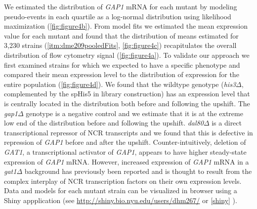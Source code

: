 {We estimated the distribution of \textit{GAP1} mRNA for each mutant by
modeling pseudo-events in each quartile as a
log-normal distribution using likelihood maximization  
(\autoref{fig:figure4b}). 
From model fits we estimated the mean expression value for each
mutant and found that the distribution of means estimated for
3,230 strains (\autoref{itm:dme209pooledFits}, \autoref{fig:figure4c}) 
recapitulates the overall
distribution of flow cytometry signal (\autoref{fig:figure4a}). 
To validate our approach we first examined
strains for which we expected to have a specific phenotype and
compared their mean expression level to the distribution of expression
for the entire population (\autoref{fig:figure4d}). We found that the wildtype
genotype (\textit{his3}$\Delta$, complemented by the spHis5 in
library construction) has an expression level that is centrally
located in the distribution both before and following the upshift. The
\textit{gap1}$\Delta$ genotype is a negative control and 
we estimate that it is at the extreme
low end of the distribution before and following the upshift. 
\textit{dal80}$\Delta$ is a direct transcriptional repressor
of NCR transcripts %
and we found that this is defective in
repression of \textit{GAP1} before and after the upshift. 
Counter-intuitively, deletion of \textit{GAT1}, a transcriptional activator
of \textit{GAP1}, appears to have higher steady-state expression of
\textit{GAP1} mRNA.
However, increased expression of \textit{GAP1} mRNA in a
\textit{gat1}$\Delta$ background has
previously been reported \parencite{scherens2006identification} and is thought to
result from the complex interplay of NCR transcription factors on
their own expression levels. 
Data and models for each mutant strain can be visualized in browser
using a Shiny appplication (see
\url{http://shiny.bio.nyu.edu/users/dhm267/} or \autoref{shiny} ). 

}
